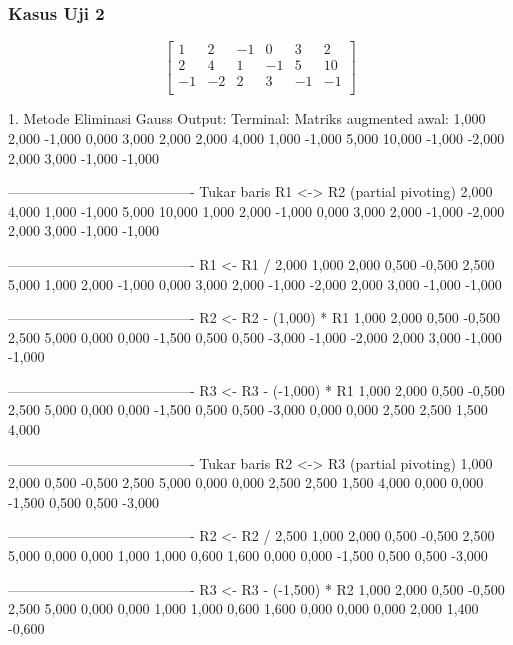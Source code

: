 \documentclass[12pt]{article}
\begin{document}
\begin{enumerate}
\subsubsection{Kasus Uji 2}
\begin{equation}
    \begin{bmatrix}
        1 & 2 & -1 & 0 & 3 & 2 \\
        2 & 4 & 1 & -1 & 5 & 10 \\
        -1 & -2 & 2 & 3 & -1 & -1 \\
    \end{bmatrix}
\end{equation}
\begin{keluaran}
1. Metode Eliminasi Gauss
Output:
Terminal:
Matriks augmented awal:
1,000   2,000   -1,000  0,000   3,000   2,000
2,000   4,000   1,000   -1,000  5,000   10,000
-1,000  -2,000  2,000   3,000   -1,000  -1,000

----------------------------------------
Tukar baris R1 <-> R2 (partial pivoting)
2,000   4,000   1,000   -1,000  5,000   10,000
1,000   2,000   -1,000  0,000   3,000   2,000
-1,000  -2,000  2,000   3,000   -1,000  -1,000

----------------------------------------
R1 <- R1 / 2,000
1,000   2,000   0,500   -0,500  2,500   5,000
1,000   2,000   -1,000  0,000   3,000   2,000
-1,000  -2,000  2,000   3,000   -1,000  -1,000

----------------------------------------
R2 <- R2 - (1,000) * R1
1,000   2,000   0,500   -0,500  2,500   5,000
0,000   0,000   -1,500  0,500   0,500   -3,000
-1,000  -2,000  2,000   3,000   -1,000  -1,000

----------------------------------------
R3 <- R3 - (-1,000) * R1
1,000   2,000   0,500   -0,500  2,500   5,000
0,000   0,000   -1,500  0,500   0,500   -3,000
0,000   0,000   2,500   2,500   1,500   4,000

----------------------------------------
Tukar baris R2 <-> R3 (partial pivoting)
1,000   2,000   0,500   -0,500  2,500   5,000
0,000   0,000   2,500   2,500   1,500   4,000
0,000   0,000   -1,500  0,500   0,500   -3,000

----------------------------------------
R2 <- R2 / 2,500
1,000   2,000   0,500   -0,500  2,500   5,000
0,000   0,000   1,000   1,000   0,600   1,600
0,000   0,000   -1,500  0,500   0,500   -3,000

----------------------------------------
R3 <- R3 - (-1,500) * R2
1,000   2,000   0,500   -0,500  2,500   5,000
0,000   0,000   1,000   1,000   0,600   1,600
0,000   0,000   0,000   2,000   1,400   -0,600


\end{keluaran}
\end{enumerate}
\end{document}
